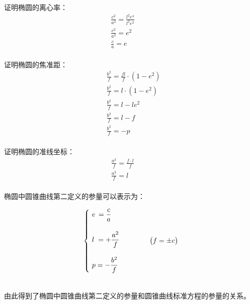 \documentclass[UTF8]{ctexart}
\begin{document}
\newpage

    证明椭圆的离心率：
    \begin{align}
        &\frac{c^2}{a^2}=\frac{l^2e^4}{l^2e^2}~~~~~~~~~~~~~~\\[3mm]
        &\frac{c^2}{a^2}=e^2\\[3mm]
        &\frac{c}{a}=e
    \end{align}\\
    证明椭圆的焦准距：
    \begin{align}
        &\frac{b^2}{f}=\frac{fl}{f}\cdot\left(1-e^2\right)\\[3mm]
        &\frac{b^2}{f}=l\cdot\left(1-e^2\right)\\[3mm]
        &\frac{b^2}{f}=l-le^2\\[3mm]
        &\frac{b^2}{f}=l-f\\[3mm]
        &\frac{b^2}{f}=-p
    \end{align}\\
    证明椭圆的准线坐标：
    \begin{align}
        &\frac{a^2}{f}=\frac{f\cdot l}{f}~~~~~~~~~~~~~~\\[3mm]
        &\frac{a^2}{f}=l
    \end{align}\\
    椭圆中圆锥曲线第二定义的参量可以表示为：\vspace{3pt}
    \begin{large}
        \begin{equation*}
            \begin{cases}
                ~e\hspace{2.0pt}=\dfrac{c}{a}\\[6mm]
                ~l\hspace{3.0pt}=+\dfrac{a^2}{f}\\[6mm]
                ~p=-\dfrac{b^2}{f}
            \end{cases}~~~~~~~~~\big(f=\pm c\big)
        \end{equation*}
    \end{large}\\
    由此得到了椭圆中圆锥曲线第二定义的参量和圆锥曲线标准方程的参量的关系。

\newpage
\end{document}
